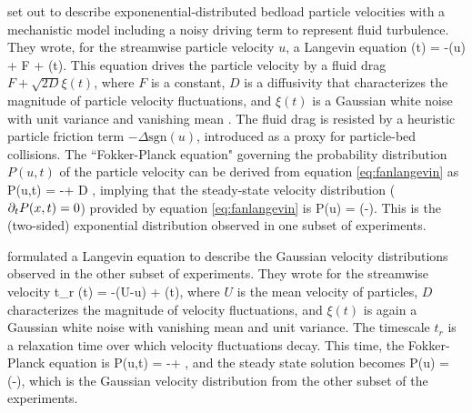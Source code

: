 \citet{Fan2014} set out to describe exponenential-distributed bedload particle velocities with a mechanistic model including a noisy driving term to represent fluid turbulence.
They wrote, for the streamwise particle velocity $u$, a Langevin equation
\be {}(t) = -\Delta {}(u) + F + \xi(t). \label{eq:fanlangevin}\ee
This equation drives the particle velocity by a fluid drag $F + \sqrt{2D} \xi(t)$, where $F$ is a constant, $D$ is a diffusivity that characterizes the magnitude of particle velocity fluctuations, and $\xi(t)$ is a Gaussian white noise with unit variance and vanishing mean \citep{Gardiner1983}. The fluid drag is resisted by a heuristic particle friction term $-\Delta \text{sgn}(u)$, introduced as a proxy for particle-bed collisions. The ``Fokker-Planck equation" governing the probability distribution $P(u,t)$ of the particle velocity can be derived from equation \ref{eq:fanlangevin} as \citep{Risken1989,VanKampen2007} 
\be {} P(u,t) = -\Delta{} + D ,\ee
implying that the steady-state velocity distribution ($\partial_t P(x,t) = 0$) provided by equation \ref{eq:fanlangevin} is
\be P(u) = \exp\Big(-\Big).\ee
This is the (two-sided) exponential distribution observed in one subset of experiments.

\citet{Ancey2014} formulated a Langevin equation to describe the Gaussian velocity distributions observed in the other subset of experiments. They wrote for the streamwise velocity 
\be t_r (t) = -(U-u) + \xi(t),\ee
where $U$ is the mean velocity of particles, $D$ characterizes the magnitude of velocity fluctuations, and $\xi(t)$ is again a Gaussian white noise with vanishing mean and unit variance. The timescale $t_r$ is a relaxation time over which velocity fluctuations decay. This time, the Fokker-Planck equation is
\be {} P(u,t) = - + ,\ee 
and the steady state solution becomes
\be P(u) =  \exp\Big(-\Big), \ee
which is the Gaussian velocity distribution from the other subset of the experiments.

